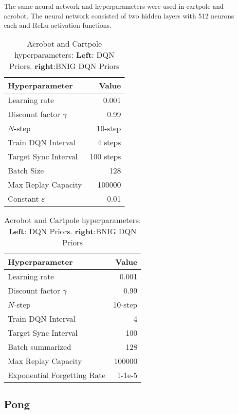 {{The same neural network and hyperparameters were used in cartpole and acrobot. The neural network consisted of two hidden layers with 512 neurons each and ReLu activation functions.

\begin{table}[H]
    \centering
    \begin{tabular}{@{}lr@{}}
        \toprule
        Hyperparameter               & Value \\ \midrule
        Learning rate                & 0.001 \\
        Discount factor $\gamma$     & 0.99  \\
        $N$-step                     & 10-step \\
        Train DQN Interval           & 4 steps \\
        Target Sync Interval         & 100 steps \\
        Batch Size                   & 128 \\
        Max Replay Capacity          & 100000 \\ 
        Constant $\varepsilon$       & 0.01 \\ \bottomrule
    \end{tabular}
    \quad
    \begin{tabular}{@{}lr@{}}
        \toprule
        Hyperparameter               & Value \\ \midrule
        Learning rate                & 0.001 \\
        Discount factor $\gamma$     & 0.99  \\
        $N$-step                     & 10-step \\
        Train DQN Interval           & 4 \\
        Target Sync Interval         & 100 \\
        Batch summarized             & 128 \\
        Max Replay Capacity          & 100000 \\
        Exponential Forgetting Rate  & 1-1e-5 \\ \bottomrule
    \end{tabular}
    \caption{Acrobot and Cartpole hyperparameters: \textbf{Left}: DQN Priors. \textbf{right}:BNIG DQN Priors}
\end{table}

\subsection{Pong}

}}
